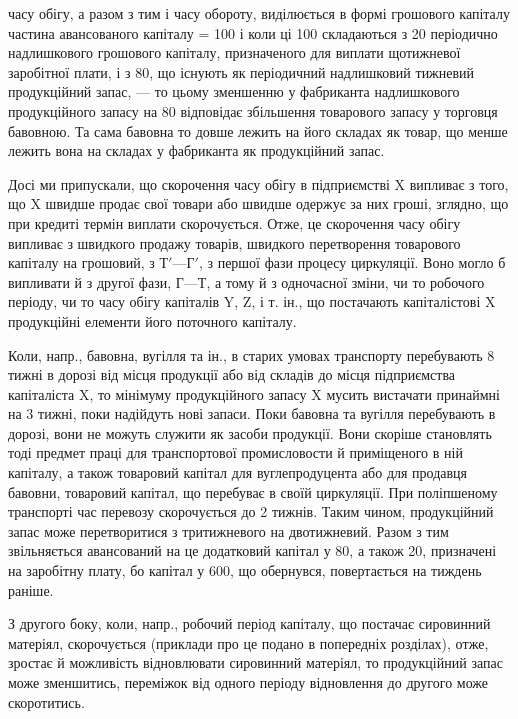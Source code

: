 \parcont{}  %
часу обігу, а разом з тим і часу обороту, виділюється в формі грошового
капіталу  частина авансованого капіталу = 100 і коли
ці 100 складаються з 20 періодично надлишкового
грошового капіталу, призначеного для виплати щотижневої заробітної
плати, і з 80, що існують як періодичний надлишковий тижневий
продукційний запас, — то цьому зменшенню у фабриканта надлишкового
продукційного запасу на 80 відповідає збільшення товарового
запасу у торговця бавовною. Та сама бавовна то довше лежить
на його складах як товар, що менше лежить вона на складах у фабриканта
як продукційний запас.

Досі ми припускали, що скорочення часу обігу в підприємстві X випливає
з того, що X швидше продає свої товари або швидше одержує
за них гроші, зглядно, що при кредиті термін виплати скорочується.
Отже, це скорочення часу обігу випливає з швидкого продажу товарів,
швидкого перетворення товарового капіталу на грошовий, з $Т' — Г'$, з
першої фази процесу циркуляції. Воно могло б випливати й з другої фази,
$Г — Т$, а тому й з одночасної зміни, чи то робочого періоду, чи то часу
обігу капіталів Y, Z, і т. ін., що постачають капіталістові X продукційні
елементи його поточного капіталу.

Коли, напр., бавовна, вугілля та ін., в старих умовах транспорту перебувають
8 тижні в дорозі від місця продукції або від складів до місця
підприємства капіталіста X, то мінімуму продукційного запасу X мусить
вистачати принаймні на 3 тижні, поки надійдуть нові запаси. Поки
бавовна та вугілля перебувають в дорозі, вони не можуть служити як
засоби продукції. Вони скоріше становлять тоді предмет праці для транспортової
промисловости й приміщеного в ній капіталу, а також товаровий
капітал для вуглепродуцента або для продавця бавовни, товаровий капітал,
що перебуває в своїй циркуляції. При поліпшеному транспорті час
перевозу скорочується до 2 тижнів. Таким чином, продукційний запас може
перетворитися з тритижневого на двотижневий. Разом з тим звільняється
авансований на це додатковий капітал у 80, а також 20, призначені на заробітну плату, бо капітал у 600,
що обернувся, повертається на тиждень раніше.

З другого боку, коли, напр., робочий період капіталу, що постачає
сировинний матеріял, скорочується (приклади про це подано в попередніх
розділах), отже, зростає й можливість відновлювати сировинний матеріял,
то продукційний запас може зменшитись, переміжок від одного періоду
відновлення до другого може скоротитись.

